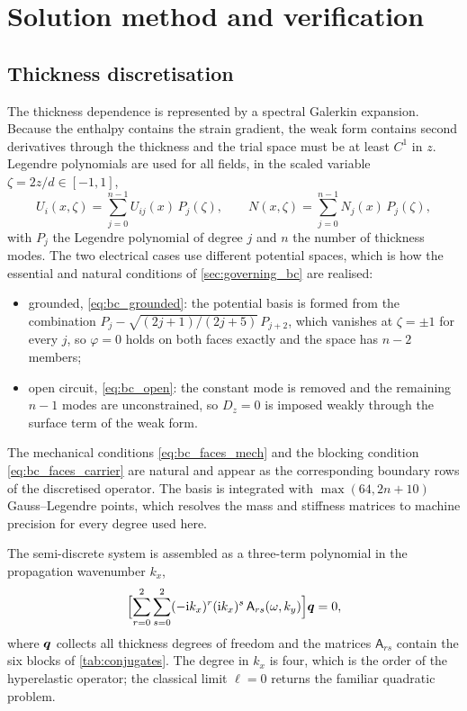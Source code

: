 \section{Solution method and verification}
\label{sec:numerics}

\subsection{Thickness discretisation}
\label{sec:numerics_basis}

The thickness dependence is represented by a spectral Galerkin expansion.
Because the enthalpy contains the strain gradient, the weak form contains second
derivatives through the thickness and the trial space must be at least $C^1$ in
$z$.  Legendre polynomials are used for all fields, in the scaled variable
$\zeta=2z/d\in[-1,1]$,
\begin{equation}
\label{eq:basis}
U_i(x,\zeta)=\sum_{j=0}^{n-1}U_{ij}(x)\,P_j(\zeta),\qquad
N(x,\zeta)=\sum_{j=0}^{n-1}N_{j}(x)\,P_j(\zeta),
\end{equation}
with $P_j$ the Legendre polynomial of degree $j$ and $n$ the number of
thickness modes.  The two electrical cases use different potential spaces,
which is how the essential and natural conditions of
\cref{sec:governing_bc} are realised:
\begin{itemize}
\item grounded, \eqref{eq:bc_grounded}: the potential basis is formed from the
combination $P_j-\sqrt{(2j+1)/(2j+5)}\,P_{j+2}$, which vanishes at
$\zeta=\pm1$ for every $j$, so $\varphi=0$ holds on both faces exactly and the
space has $n-2$ members;
\item open circuit, \eqref{eq:bc_open}: the constant mode is removed and the
remaining $n-1$ modes are unconstrained, so $D_z=0$ is imposed weakly through
the surface term of the weak form.
\end{itemize}
The mechanical conditions \eqref{eq:bc_faces_mech} and the blocking condition
\eqref{eq:bc_faces_carrier} are natural and appear as the corresponding boundary
rows of the discretised operator.  The basis is integrated with
$\max(64,2n+10)$ Gauss--Legendre points, which resolves the mass and stiffness
matrices to machine precision for every degree used here.

The semi-discrete system is assembled as a three-term polynomial in the
propagation wavenumber $k_x$,
\begin{equation}
\label{eq:polynomial}
\Bigl[\sum_{r=0}^{2}\sum_{s=0}^{2}(-\mathrm{i} k_x)^{r}(\mathrm{i} k_x)^{s}\,
\mathsf{A}_{rs}(\omega,k_y)\Bigr]\boldsymbol{q}=0 ,
\end{equation}
where $\boldsymbol{q}$ collects all thickness degrees of freedom and the matrices
$\mathsf{A}_{rs}$ contain the six blocks of \cref{tab:conjugates}.  The degree
in $k_x$ is four, which is the order of the hyperelastic operator; the classical
limit $\ell=0$ returns the familiar quadratic problem.


